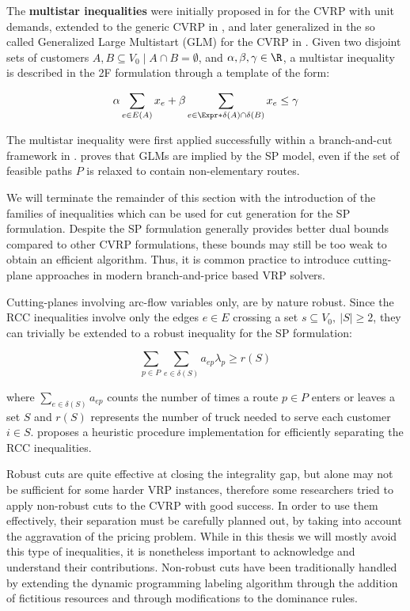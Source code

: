 The \textbf{multistar inequalities} were initially proposed in \textcite{araque1990} for the CVRP with unit demands,
extended to the generic CVRP in \textcite{gouveia1995, achuthan1998},
and later generalized in the so called Generalized Large Multistart (GLM) for the CVRP in \textcite{letchford2002,letchford2006}.
Given two disjoint sets of customers $A, B \subseteq V_0 \mid A \cap B = \emptyset$,
and $\alpha, \beta, \gamma \in \R$,
a multistar inequality is described in the 2F formulation through a
template of the form:

\begin{equation}
	\alpha \sum_{e \in E(A)} x_e + \beta \sum_{e \in \Expr*{\delta(A) \cap \delta(B)}} x_e \le \gamma
\end{equation}

The multistar inequality were first applied successfully within a branch-and-cut framework
in \textcite{araqueg1994}.
\textcite{letchford2006} proves that GLMs are implied by the SP model,
even if the set of feasible paths $P$ is relaxed to contain non-elementary routes.

\medskip


We will terminate the remainder of this section with the introduction
of the families of inequalities which can be used for cut generation
for the SP formulation.
Despite the SP formulation generally provides better dual bounds
compared to other CVRP formulations,
these bounds may still be too weak to obtain an efficient algorithm.
Thus, it is common practice to introduce cutting-plane approaches
in modern branch-and-price based VRP solvers.

Cutting-planes involving arc-flow variables only, are by nature
robust.
Since the RCC inequalities involve only the edges $e \in E$ crossing a set $s \subseteq V_0,\ |S| \ge 2$,
they can trivially be extended to a robust inequality for the SP formulation:

\begin{equation}
	\sum_{p \in P} \sum_{e \in \delta(S)}  a_{ep} \lambda_p \ge r(S)
\end{equation}


where $\sum_{e \in \delta(S)} a_{ep}$ counts the number of times a route $p \in P$
enters or leaves a set $S$ and $r(S)$ represents the number of truck needed
to serve each customer $i \in S$.
\textcite{lysgaard2003cvrpsep} proposes a heuristic procedure implementation
for efficiently separating the RCC inequalities.

\medskip

Robust cuts are quite effective at closing the integrality gap, but alone may not
be sufficient for some harder VRP instances,
therefore some researchers tried to apply non-robust cuts to the CVRP with good success.
In order to use them effectively, their separation must be carefully
planned out, by taking into account the aggravation of the pricing problem.
While in this thesis we will mostly avoid this type of inequalities,
it is nonetheless important to acknowledge and understand their contributions.
Non-robust cuts have been traditionally handled by extending the
dynamic programming labeling algorithm
through the addition of fictitious resources and through modifications to the dominance rules.

